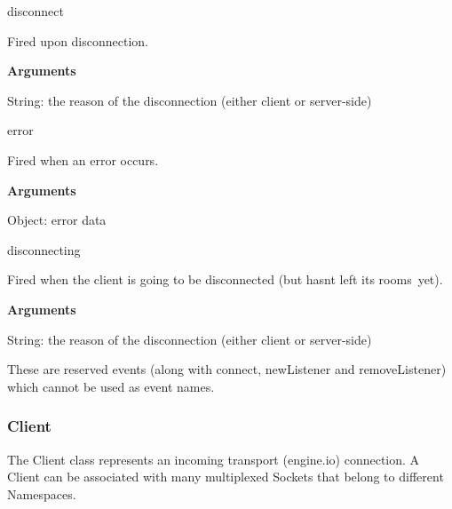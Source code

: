 \begin{DoxyItemize}
\item {\ttfamily disconnect}
\begin{DoxyItemize}
\item Fired upon disconnection.
\item {\bfseries Arguments}
\begin{DoxyItemize}
\item {\ttfamily String}\+: the reason of the disconnection (either client or server-\/side)
\end{DoxyItemize}
\end{DoxyItemize}
\item {\ttfamily error}
\begin{DoxyItemize}
\item Fired when an error occurs.
\item {\bfseries Arguments}
\begin{DoxyItemize}
\item {\ttfamily Object}\+: error data
\end{DoxyItemize}
\end{DoxyItemize}
\item {\ttfamily disconnecting}
\begin{DoxyItemize}
\item Fired when the client is going to be disconnected (but hasn\textquotesingle{}t left its {\ttfamily rooms} yet).
\item {\bfseries Arguments}
\begin{DoxyItemize}
\item {\ttfamily String}\+: the reason of the disconnection (either client or server-\/side)
\end{DoxyItemize}
\end{DoxyItemize}
\end{DoxyItemize}

These are reserved events (along with {\ttfamily connect}, {\ttfamily new\+Listener} and {\ttfamily remove\+Listener}) which cannot be used as event names.

\subsubsection*{Client}

The {\ttfamily Client} class represents an incoming transport (engine.\+io) connection. A {\ttfamily Client} can be associated with many multiplexed {\ttfamily Socket}s that belong to different {\ttfamily Namespace}s.

